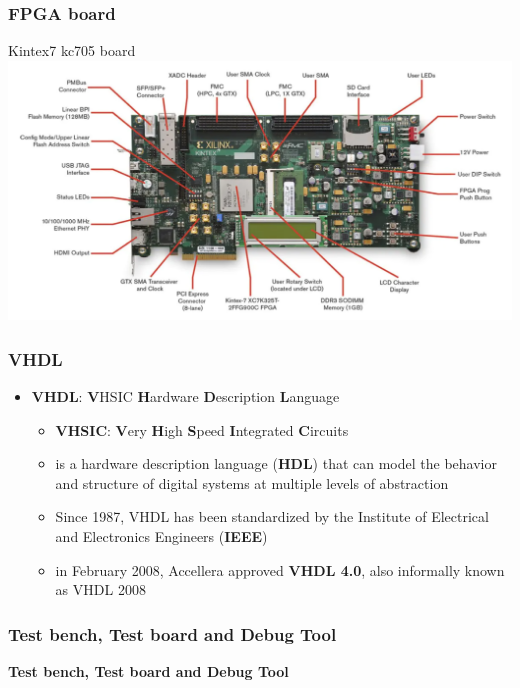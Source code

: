 \documentclass[aspectratio=169]{beamer}
\begin{document}
	
	\begin{frame}
	\frametitle{FPGA board }
	\begin{center}
		Kintex7 kc705 board
		\includegraphics[width=0.85 \textwidth]{IMG/KC705.PNG}
	\end{center}
	\end{frame}

	\begin{frame}
	\frametitle{VHDL}
	{\Large
	\begin{itemize}
		\item \textbf{VHDL}: \textbf{V}HSIC \textbf{H}ardware \textbf{D}escription \textbf{L}anguage 
		\begin{itemize}
			\item \textbf{VHSIC}: \textbf{V}ery \textbf{H}igh \textbf{S}peed \textbf{I}ntegrated \textbf{C}ircuits
			\item is a hardware description language (\textbf{HDL}) that can model the behavior and structure of digital systems at multiple levels of abstraction
			\item Since 1987, VHDL has been standardized by the Institute of Electrical and Electronics Engineers (\textbf{IEEE})
			\item in February 2008, Accellera approved \textbf{VHDL 4.0}, also informally known as VHDL 2008
		\end{itemize}
	\end{itemize}
	}
	\end{frame}


	\begin{frame}
	\frametitle{Test bench, Test board and Debug Tool}
	\begin{center}
		{\Huge {}\selectfont \color{blue} \textbf{Test bench, Test board and Debug Tool}}
	\end{center}
	\end{frame}
\end{document}
